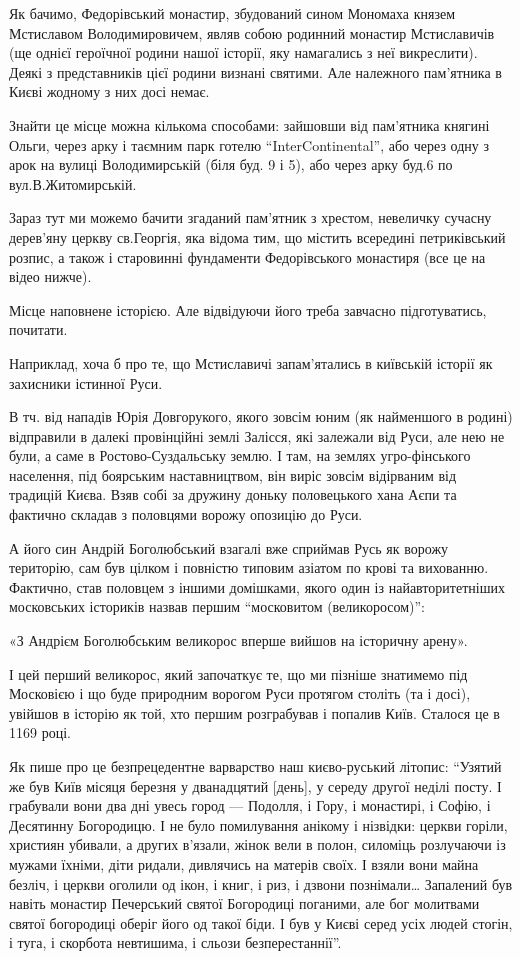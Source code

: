 Як бачимо, Федорівський монастир, збудований сином Мономаха князем Мстиславом
Володимировичем, являв собою родинний монастир Мстиславичів (ще однієї
героїчної родини нашої історії, яку намагались з неї викреслити). Деякі з
представників цієї родини визнані святими. Але належного пам’ятника в Києві
жодному з них досі немає.

Знайти це місце можна кількома способами: зайшовши від пам’ятника княгині
Ольги, через арку і таємним парк готелю \enquote{InterContinental}, або через
одну з арок на вулиці Володимирській (біля буд. 9 і 5), або через арку буд.6 по
вул.В.Житомирській. 

Зараз тут ми можемо бачити згаданий пам’ятник з хрестом, невеличку сучасну
дерев’яну церкву св.Георгія, яка відома тим, що містить всередині петриківський
розпис, а також і старовинні фундаменти Федорівського монастиря (все це на
відео нижче). 

Місце наповнене історією. Але відвідуючи його треба завчасно підготуватись,
почитати.

Наприклад, хоча б про те, що Мстиславичі запам'ятались в київській історії як
захисники істинної Руси. 

В тч. від нападів Юрія Довгорукого, якого зовсім юним (як найменшого в родині)
відправили в далекі провінційні землі Залісся, які залежали від Руси, але нею
не були, а саме в Ростово-Суздальську землю. І там, на землях угро-фінського
населення, під боярським наставництвом, він виріс зовсім відірваним від
традицій Києва. Взяв собі за дружину доньку половецького хана Аєпи та фактично
складав з половцями ворожу опозицію до Руси. 

А його син Андрій Боголюбський взагалі вже сприймав Русь як ворожу територію,
сам був цілком і повністю типовим азіатом по крові та вихованню. Фактично, став
половцем з іншими домішками, якого один із найавторитетніших московських
істориків назвав першим \enquote{московитом (великоросом)}: 

«З Андрієм Боголюбським великорос вперше вийшов на історичну арену». 

І цей перший великорос, який започаткує те, що ми пізніше знатимемо під
Московією і що буде природним ворогом Руси протягом століть (та і досі),
увійшов в історію як той, хто першим розграбував і попалив Київ. Сталося це в
1169 році.

Як пише про це безпрецедентне варварство наш києво-руський літопис: \enquote{Узятий же
був Київ місяця березня у дванадцятий [день], у середу другої неділі посту. І
грабували вони два дні увесь город — Подолля, і Гору, і монастирі, і Софію, і
Десятинну Богородицю. І не було помилування анікому і нізвідки: церкви горіли,
християн убивали, а других в’язали, жінок вели в полон, силоміць розлучаючи із
мужами їхніми, діти ридали, дивлячись на матерів своїх. І взяли вони майна
безліч, і церкви оголили од ікон, і книг, і риз, і дзвони познімали… Запалений
був навіть монастир Печерський святої Богородиці поганими, але бог молитвами
святої богородиці оберіг його од такої біди. І був у Києві серед усіх людей
стогін, і туга, і скорбота невтишима, і сльози безперестаннії}. 

